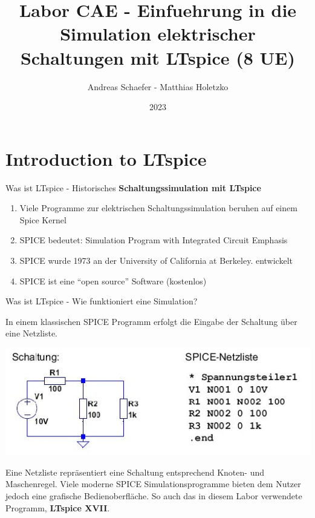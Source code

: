 \documentclass{beamer}
\title{Labor CAE - Einfuehrung in die Simulation elektrischer
Schaltungen mit LTspice (8 UE)}
\date{2023}
\author{Andreas Schaefer - Matthias Holetzko}
\institute{Duale Hochschule Baden-Württemberg  \newline -- \newline Fakultät Technik \newline Studiengang Mechatronik}
\begin{document}
  \maketitle
  \section{Introduction to LTspice}
  
  \begin{frame}{Was ist LTspice - Historisches}
 \textbf{Schaltungssimulation mit LTspice}\newline
 \begin{enumerate}
 \item Viele Programme zur elektrischen Schaltungssimulation beruhen auf einem Spice Kernel
 \item SPICE bedeutet: Simulation Program with Integrated Circuit Emphasis
 \item SPICE wurde 1973 an der University of California at Berkeley. entwickelt
 \item SPICE ist eine “open source” Software (kostenlos)
 \end{enumerate}
 \end{frame}
  
 \begin{frame}[fragile]{Was ist LTspice - Wie funktioniert eine Simulation?}
	
	In einem klassischen SPICE Programm erfolgt die Eingabe der Schaltung über eine
	Netzliste.
\begin{center}
\includegraphics[scale=0.5]{pictures/page1.jpg}
\end{center}

	Eine Netzliste repräsentiert eine Schaltung entsprechend Knoten- und Maschenregel. \newline Viele moderne SPICE Simulationsprogramme
	bieten dem Nutzer jedoch eine grafische Bedienoberfläche. 
	So auch das in diesem Labor verwendete Programm, \textbf{LTspice XVII}. 


  \end{frame}
  
\end{document}
